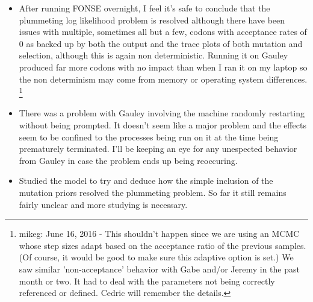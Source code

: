 \documentclass[11pt]{labbook}
\begin{document}
\begin{itemize}
    \item After running FONSE overnight, I feel it's safe to conclude that the plummeting log likelihood problem is resolved although there have been issues with multiple, sometimes all but a few, codons with acceptance rates of 0 as backed up by both the output and the trace plots of both mutation and selection, although this is again non deterministic. Running it on Gauley produced far more codons with no impact than when I ran it on my laptop so the non determinism may come from memory or operating system differences.
\footnote{mikeg: June 16, 2016 -
  This shouldn't happen since we are using an MCMC whose step sizes adapt based on the acceptance ratio of the previous samples. 
  (Of course, it would be good to make sure this adaptive option is set.)
  We saw similar 'non-acceptance' behavior with Gabe and/or Jeremy in the past month or two.
  It had to deal with the parameters not being correctly referenced or defined.
  Cedric will remember the details.
}
    \item There was a problem with Gauley involving the machine randomly restarting without being prompted. It doesn't seem like a major problem and the effects seem to be confined to the processes being run on it at the time being prematurely terminated. I'll be keeping an eye for any unespected behavior from Gauley in case the problem ends up being reoccuring.
    \item Studied the model to try and deduce how the simple inclusion of the mutation priors resolved the plummeting problem. So far it still remains fairly unclear and more studying is necessary. 
\end{itemize}
\end{document}
